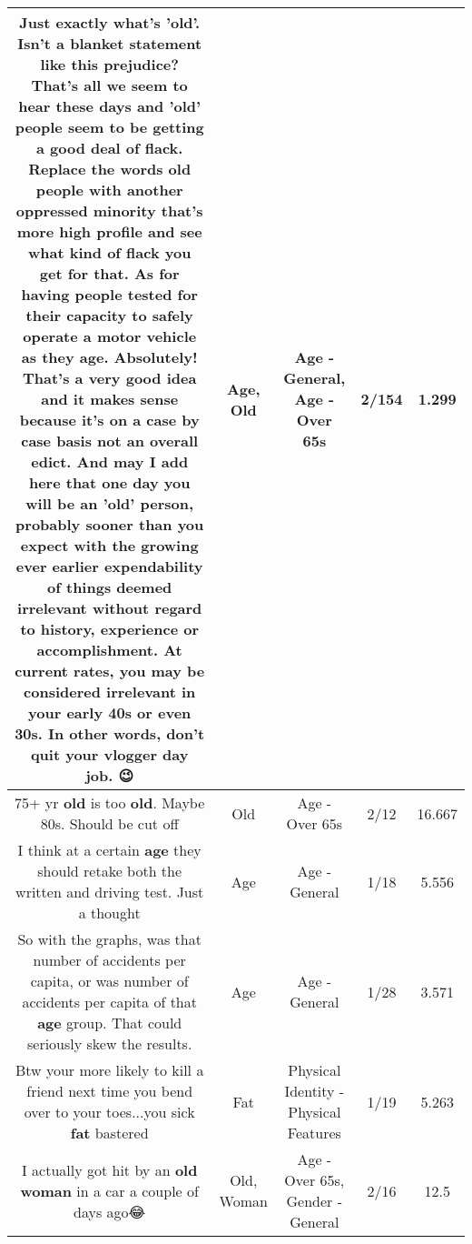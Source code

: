 \documentclass[11pt]{article}
\newlength\mylength
\begin{document}
\begin{center}
\begin{longtable}{|C{.65\mylength}|C{.30\mylength}|C{.12\mylength}|C{.12\mylength}|C{.12\mylength}|}
  \small Just exactly what's '\textbf{old}'. Isn't a blanket statement like this prejudice? That's all we seem to hear these days and '\textbf{old}' people seem to be getting a good deal of flack. Replace the words \textbf{old} people with another oppressed minority that's more high profile and see what kind of flack you get for that. As for having people tested for their capacity to safely operate a motor vehicle as they \textbf{age}. Absolutely! That's a very good idea and it makes sense because it's on a case by case basis not an overall edict. And may I add here that one day you will be an '\textbf{old}' person, probably sooner than you expect with the growing ever earlier expendability of things deemed irrelevant without regard to history, experience or accomplishment. At current rates, you may be considered irrelevant in your early 40s or even 30s. In other words, don't quit your vlogger day job. 😉\normalsize   & Age, Old & Age - General, Age - Over 65s & 2/154 & 1.299 \\  \hline
  \small 75+ yr \textbf{old} is too \textbf{old}. Maybe 80s. Should be cut off\normalsize   & Old & Age - Over 65s & 2/12 & 16.667 \\  \hline
  \small I think at a certain \textbf{age} they should retake both the written and driving test. Just a thought\normalsize   & Age & Age - General & 1/18 & 5.556 \\  \hline
  \small So with the graphs, was that number of accidents per capita, or was number of accidents per capita of that \textbf{age} group. That could seriously skew the results.\normalsize   & Age & Age - General & 1/28 & 3.571 \\  \hline
  \small Btw your more likely to kill a friend next time you bend over to your toes...you sick \textbf{fat} bastered\normalsize   & Fat & Physical Identity - Physical Features & 1/19 & 5.263 \\  \hline
  \small I actually got hit by an \textbf{old} \textbf{woman} in a car a couple of days ago😂\normalsize   & Old, Woman & Age - Over 65s, Gender - General & 2/16 & 12.5 \\  \hline

\end{longtable}
\end{center}
\end{document}
